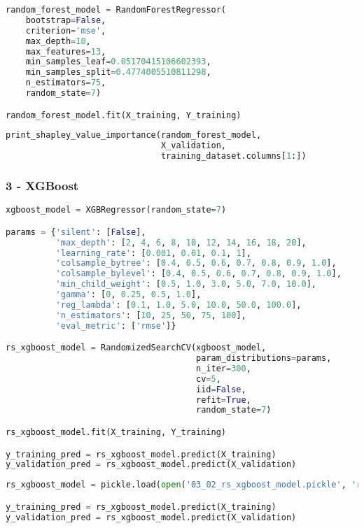 \begin{lstlisting}[language=Python]
random_forest_model = RandomForestRegressor(
    bootstrap=False,
    criterion='mse',
    max_depth=10,
    max_features=13,
    min_samples_leaf=0.05170415106602393,
    min_samples_split=0.4774005510811298,
    n_estimators=75,
    random_state=7)

random_forest_model.fit(X_training, Y_training)
\end{lstlisting}

\begin{lstlisting}[language=Python]
print_shapley_value_importance(random_forest_model,
                               X_validation,
                               training_dataset.columns[1:])
\end{lstlisting}

\hypertarget{xgboost}{%
\subsubsection{3 - XGBoost}\label{xgboost}}

\begin{lstlisting}[language=Python]
xgboost_model = XGBRegressor(random_state=7)

params = {'silent': [False],
          'max_depth': [2, 4, 6, 8, 10, 12, 14, 16, 18, 20],
          'learning_rate': [0.001, 0.01, 0.1, 1],
          'colsample_bytree': [0.4, 0.5, 0.6, 0.7, 0.8, 0.9, 1.0],
          'colsample_bylevel': [0.4, 0.5, 0.6, 0.7, 0.8, 0.9, 1.0],
          'min_child_weight': [0.5, 1.0, 3.0, 5.0, 7.0, 10.0],
          'gamma': [0, 0.25, 0.5, 1.0],
          'reg_lambda': [0.1, 1.0, 5.0, 10.0, 50.0, 100.0],
          'n_estimators': [10, 25, 50, 75, 100],
          'eval_metric': ['rmse']}

rs_xgboost_model = RandomizedSearchCV(xgboost_model,
                                      param_distributions=params,
                                      n_iter=300,
                                      cv=5,
                                      iid=False,
                                      refit=True,
                                      random_state=7)

rs_xgboost_model.fit(X_training, Y_training)

y_training_pred = rs_xgboost_model.predict(X_training)
y_validation_pred = rs_xgboost_model.predict(X_validation)
\end{lstlisting}

\begin{lstlisting}[language=Python]
rs_xgboost_model = pickle.load(open('03_02_rs_xgboost_model.pickle', 'rb'))

y_training_pred = rs_xgboost_model.predict(X_training)
y_validation_pred = rs_xgboost_model.predict(X_validation)
\end{lstlisting}

